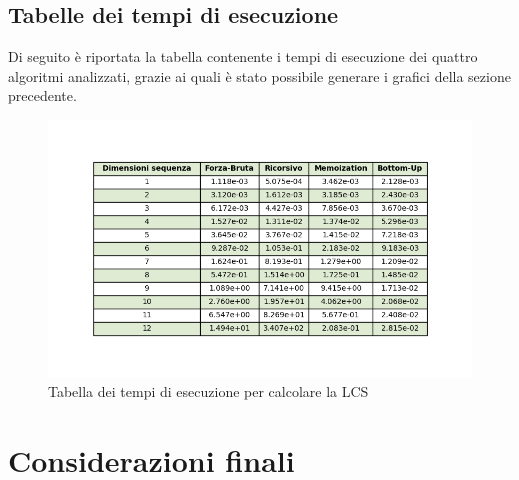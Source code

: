 \documentclass{article}
\begin{document}
\subsection{Tabelle dei tempi di esecuzione}

Di seguito è riportata la tabella contenente i tempi di esecuzione dei quattro algoritmi analizzati, grazie ai quali è stato possibile generare i grafici della sezione precedente.

\begin{figure} [!h]
    \centering
    \includegraphics[width=1\linewidth]{table/TabellaLCS.png}
    \caption{Tabella dei tempi di esecuzione per calcolare la LCS}
    \label{fig:enter-label}
\end{figure}

\newpage

\section{Considerazioni finali}
\end{document}
